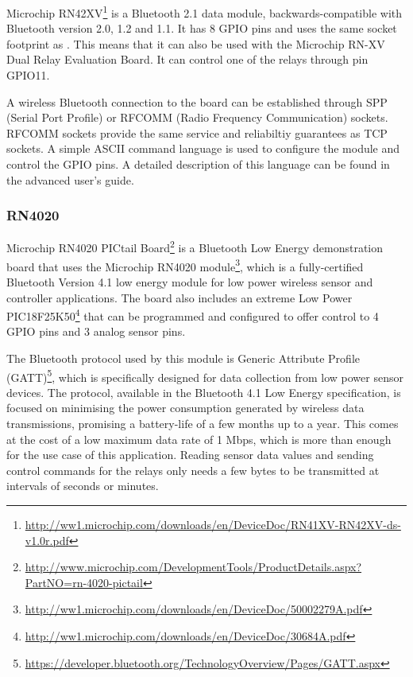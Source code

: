 Microchip RN42XV\footnote{\url{http://ww1.microchip.com/downloads/en/DeviceDoc/RN41XV-RN42XV-ds-v1.0r.pdf}} is a Bluetooth 2.1 data module, backwards-compatible with Bluetooth version 2.0, 1.2 and 1.1. It has 8 GPIO pins and uses the same socket footprint as . This means that it can also be used with the Microchip RN-XV Dual Relay Evaluation Board. It can control one of the relays through pin GPIO11.

A wireless Bluetooth connection to the board can be established through SPP (Serial Port Profile) or RFCOMM (Radio Frequency Communication) sockets. RFCOMM sockets provide the same service and reliabiltiy guarantees as TCP sockets. A simple ASCII command language is used to configure the module and control the GPIO pins. A detailed description of this language can be found in the advanced user's guide\cite{bt-command-user-guide}.

\subsubsection{RN4020}
Microchip RN4020 PICtail Board\footnote{\url{http://www.microchip.com/DevelopmentTools/ProductDetails.aspx?PartNO=rn-4020-pictail}} is a Bluetooth Low Energy demonstration board that uses the Microchip RN4020 module\footnote{\url{http://ww1.microchip.com/downloads/en/DeviceDoc/50002279A.pdf}}, which is a fully-certified Bluetooth Version 4.1 low energy module for low power wireless sensor and controller applications. The board also includes an extreme Low Power PIC18F25K50\footnote{\url{http://ww1.microchip.com/downloads/en/DeviceDoc/30684A.pdf}} that can be programmed and configured to offer control to 4 GPIO pins and 3 analog sensor pins.

The Bluetooth protocol used by this module is Generic Attribute Profile (GATT)\footnote{\url{https://developer.bluetooth.org/TechnologyOverview/Pages/GATT.aspx}}, which is specifically designed for data collection from low power sensor devices. The protocol, available in the Bluetooth 4.1 Low Energy specification, is focused on minimising the power consumption generated by wireless data transmissions, promising a battery-life of a few months up to a year. This comes at the cost of a low maximum data rate of 1 Mbps, which is more than enough for the use case of this application. Reading sensor data values and sending control commands for the relays only needs a few bytes to be transmitted at intervals of seconds or minutes.

